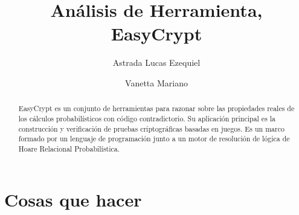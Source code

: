 \documentclass[runningheads,a4paper]{llncs}
\begin{document}
\mainmatter  %

\title{Análisis de Herramienta, EasyCrypt}


%
%
\author
{
Astrada Lucas Ezequiel
\and
Vanetta Mariano
}
%


%
%

\maketitle


\begin{abstract}    
EasyCrypt es un conjunto de herramientas para razonar sobre las propiedades reales de los cálculos probabilísticos con código contradictorio. Su aplicación principal es la construcción y verificación de pruebas criptográficas basadas en juegos. 
Es un marco formado por un lenguaje de programación junto a un motor de resolución de lógica de Hoare Relacional Probabilística.
\cite{article1}


\end{abstract}

\section{Cosas que hacer}
\end{document}
